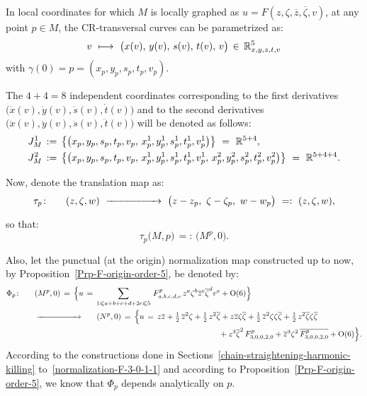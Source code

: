 \documentclass[12pt,twoside,leqno,openany]{amsart}
\begin{document}
\label{CR-invariant-1-jet-surface}

In local coordinates for which $M$ is locally graphed as 
$u = F (z, \zeta, \overline{z}, \overline{\zeta}, v)$,
at any point $p \in M$, the CR-transversal curves can be
parametrized as:
\[
v
\,\,\longmapsto\,\,
\big(
x(v),\,
y(v),\,
s(v),\,
t(v),\,
v
\big)
\,\in\,
\mathbb{R}_{x,y,z,t,v}^5
\]
with $\gamma(0) = p = (x_p, y_p, s_p, t_p, v_p)$.

The $4 + 4 = 8$ independent coordinates 
corresponding to 
the first derivatives $\big( \dot{x}(v), \dot{y}(v), \dot{s}(v),
\dot{t}(v) \big)$ and to
the second derivatives $\big( \ddot{x}(v),
\ddot{y}(v), \ddot{s}(v), \ddot{t}(v) \big)$
will be denoted as follows:
\[
\aligned
J_M^1
&
\,:=\,
\big\{
\big(
x_p,y_p,s_p,t_p,v_p,\,
x_p^1,y_p^1,s_p^1,t_p^1,v_p^1
\big)
\big\}
\,\,=\,\,
\R^{5+4},
\\
J_M^2
&
\,:=\,
\big\{
\big(
x_p,y_p,s_p,t_p,v_p,\,
x_p^1,y_p^1,s_p^1,t_p^1,v_p^1,\,
x_p^2,y_p^2,s_p^2,t_p^2,v_p^2
\big)
\big\}
\,\,=\,\,
\R^{5+4+4}.
\endaligned
\]

Now, denote the translation map as:
\[
\tau_p
\colon\ \ \ \ \
(z,\zeta,w)
\,\,
\xrightarrow[{\rule[0pt]{50pt}{0pt}}]{}
\,\,
\big(
z-z_p,\,\,
\zeta-\zeta_p,\,\,
w-w_p
\big)
\,\,=:\,\,
(z,\zeta,w),
\]
so that:
\[
\tau_p
\big(M,p\big)
\,=:\,
\big(M^p,0\big).
\]

\begin{center}

\end{center}

Also, let the punctual (at the origin) normalization map
constructed up to now, by Proposition~{\ref{Prp-F-origin-order-5}},
be denoted by:
\[
\aligned
\Phi_p
\colon\ \ \ \ \
&
(M^p,0)
\,=\,
\Big\{
u
\,=\,
\sum_{1\leqslant a+b+c+d+2e\leqslant 5}\,
F_{a,b,c,d,e}^p\,
z^a\zeta^b\overline{z}^c\overline{\zeta}^dv^e
+
{\rm O}(6)
\Big\}
\\
&
\xrightarrow[{\rule[0pt]{50pt}{0pt}}]{}
\ \ \ \ \
(N^p,0)
\,=\,
\Big\{
u
\,=\,
z\overline{z}
+
\tfrac{1}{2}\,\overline{z}^2\zeta
+
\tfrac{1}{2}\,z^2\overline{\zeta}
+
z\overline{z}\zeta\overline{\zeta}
+
\tfrac{1}{2}\,\overline{z}^2\zeta\zeta\overline{\zeta}
+
\tfrac{1}{2}\,z^2\overline{\zeta}\zeta\overline{\zeta}
\\
&
\ \ \ \ \ \ \ \ \ \ \ \ \ \ \ \ \ \ \ \ \ \ \ \ \ \ \ \ \ \ \ \ \ \ \
\ \ \ \ \ \ \ \ \ \ \ \ \ \ \ \ \ \ \ \ \ \ \ \ \ \ \ \ \ \ \ \ \ \ \
+
z^3\overline{\zeta}^2\,
F_{3,0,0,2,0}^p
+
\overline{z}^3\zeta^2\,
\overline{F_{3,0,0,2,0}^p}
+
{\rm O}(6)
\Big\}.
\endaligned
\]
According to the 
constructions done in
Sections~{\ref{chain-straightening-harmonic-killing}}
to~{\ref{normalization-F-3-0-1-1}}
and according to Proposition~{\ref{Prp-F-origin-order-5}},
we know that $\Phi_p$ depends analytically on $p$.
\end{document}
